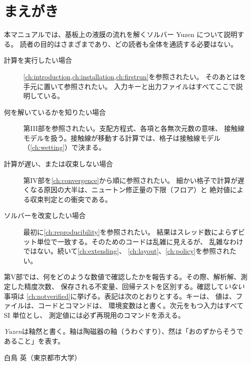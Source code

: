 \chapter*{まえがき}

本マニュアルでは、基板上の液膜の流れを解くソルバー Yuzen について説明する。
読者の目的はさまざまであり、どの読者も全体を通読する必要はない。

\begin{description}
  \item[計算を実行したい場合] \cref{ch:introduction,ch:installation,ch:firstrun}を参照されたい。
    そのあとはを手元に置いて参照されたい。
    入力キーと出力ファイルはすべてここで説明している。
  \item[何を解いているかを知りたい場合] 第III部を参照されたい。支配方程式、各項と各無次元数の意味、
    接触線モデルを扱う。接触線が移動する計算では、格子は接触線モデル（\cref{ch:wetting}）で決まる。
  \item[計算が遅い、または収束しない場合] 第IV部を\cref{ch:convergence}から順に参照されたい。
    細かい格子で計算が遅くなる原因の大半は、ニュートン修正量の下限（フロア）と
    絶対値による収束判定との衝突である。
  \item[ソルバーを改変したい場合] 最初に\cref{ch:reproducibility}を参照されたい。
    結果はスレッド数によらずビット単位で一致する。そのためのコードは乱雑に見えるが、
    乱雑なわけではない。続いて\cref{ch:extending}、
    \cref{ch:layout}、\cref{ch:policy}を参照されたい。
\end{description}

第V部では、何をどのような数値で確認したかを報告する。その際、解析解、測定した精度次数、
保存される不変量、回帰テストを区別する。確認して\emph{いない}事項は
\cref{ch:notverified}に挙げる。表記は次のとおりとする。キーは、
値は、ファイルは、コードとコマンドは、
環境変数はと書く。次元をもつ入力はすべて SI 単位とし、
測定値には必ず再現用のコマンドを添える。

\emph{Yuzen}は釉然と書く。釉は陶磁器の釉（うわぐすり）、然は「おのずからそうであること」を表す。

\medskip
\hfill 白鳥 英（東京都市大学）
